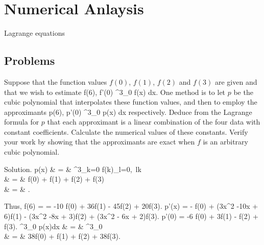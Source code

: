 \chapter{Numerical Anlaysis}

Lagrange equations

\section{Problems}

\ben

\item Suppose that the function values $f(0)$, $f(1)$, $f(2)$ and $f(3)$ are given and that we wish to estimate
\be
f(6), \quad f'(0) \quad {}\quad \int^3_0 f(x) dx.
\ee
One method is to let $p$ be the cubic polynomial that interpolates these function values, and then to employ the approximants 
\be
p(6), \quad p'(0) \quad {} \quad \int^3_0 p(x) dx
\ee
respectively. Deduce from the Lagrange formula for $p$ that each approximant is a linear combination of the four data with constant coefficients. Calculate the numerical values of these constants. Verify your work by showing that the approximants are exact when $f$ is an arbitrary cubic polynomial.



Solution. 
\beast
p(x) & = & \sum^3_{k=0} f(k)\prod_{l=0,\ l\neq k} \\
& = & f(0) + f(1)  + f(2) + f(3) \\
& = & .
\eeast

Thus,
\be
f(6) =  = -10 f(0) + 36f(1) - 45f(2) + 20f(3).
\ee
\be
p'(x) = -  f(0) +  (3x^2 -10x + 6)f(1) -  (3x^2 -8x + 3)f(2) + (3x^2 - 6x + 2)f(3).
\ee
\be
p'(0) = -6 f(0) + 3f(1) -  f(2) +  f(3).
\ee
\beast
\int^3_0 p(x)dx & = & ^3_0\\
& = & \frac 38f(0) +  f(1) +  f(2) + \frac 38f(3).
\eeast

